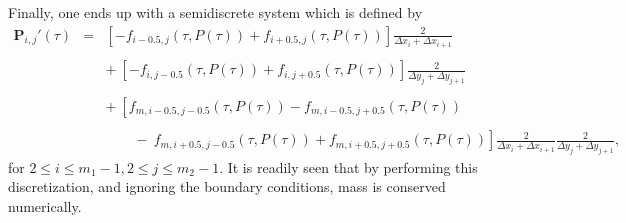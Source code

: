 \documentclass[10pt]{article}
\begin{document}
Finally, one ends up with a semidiscrete system which is defined by
\begin{eqnarray}
\boldsymbol{P}_{i,j}'(\tau) &=&  \left[ -f_{i-0.5,j}(\tau,P(\tau)) + f_{i+0.5,j}(\tau,P(\tau))\right]\frac{2}{\Delta x_{i} + \Delta x_{i+1}} \label{eq:2DDiscretizationGeneral} \\ \nonumber \\
&& + \ \left[ -f_{i,j-0.5}(\tau,P(\tau)) + f_{i,j+0.5}(\tau,P(\tau))\right]\frac{2}{\Delta y_{j} + \Delta y_{j+1}} \nonumber \\ \nonumber \\
&& + \ \left[ f_{m,i-0.5,j-0.5}(\tau,P(\tau)) - f_{m,i-0.5,j+0.5}(\tau,P(\tau))\right. \nonumber \\ \nonumber \\
&& \left. \qquad - \ f_{m,i+0.5,j-0.5}(\tau,P(\tau)) + f_{m,i+0.5,j+0.5}(\tau,P(\tau)) \right] \frac{2}{\Delta x_{i}+\Delta x_{i+1}}\frac{2}{\Delta y_{j}+\Delta y_{j+1}}, \nonumber
\end{eqnarray}
for $2 \le i \leq m_{1}-1, 2 \le j \le m_{2}-1$.
It is readily seen that by performing this discretization, and ignoring the boundary conditions, mass is conserved numerically.
\end{document}
